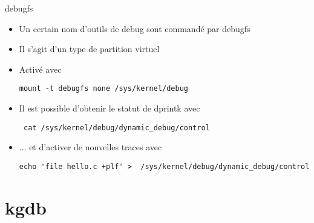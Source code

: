 \begin{frame}[fragile=singleslide]{debugfs}
  \begin{itemize} 
  \item Un certain nom d'outils de debug sont commandé par debugfs
  \item Il s'agit d'un type de partition virtuel
  \item Activé avec 
    \begin{lstlisting} 
mount -t debugfs none /sys/kernel/debug
    \end{lstlisting} 
  \item Il est possible d'obtenir le statut de dprintk avec
    \begin{lstlisting} 
 cat /sys/kernel/debug/dynamic_debug/control
    \end{lstlisting} 
  \item ... et d'activer de nouvelles traces avec 
    \begin{lstlisting} 
echo 'file hello.c +plf' >  /sys/kernel/debug/dynamic_debug/control
    \end{lstlisting} 
  \end{itemize} 
\end{frame} 


\section{kgdb}

